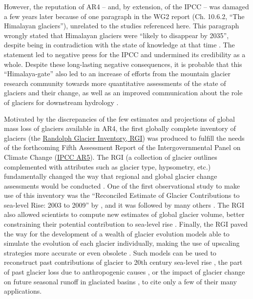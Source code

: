 However, the reputation of AR4 -- and, by extension, of the IPCC -- was damaged a few years later because of one
paragraph in the WG2 report (Ch. 10.6.2, “The Himalayan glaciers”), unrelated to the studies referenced here. This
paragraph wrongly stated that Himalayan glaciers were “likely to disappear by 2035”, despite being in contradiction with
the state of knowledge at that time \citep{Cogley2010}. The statement led to negative press for the IPCC and undermined its credibility as
a whole. Despite these long-lasting negative consequences, it is probable that this “Himalaya-gate” also led to an
increase of efforts from the mountain glacier research community towards more quantitative assessments of the state of
glaciers and their change, as well as an improved communication about the role of glaciers for downstream hydrology
\citep{Kaser.etal_2010,Radic2010,Radic2011,Bolch2012,Immerzeel2012}.

Motivated by the discrepancies of the few estimates and projections of global mass loss of glaciers available in AR4,
the first globally complete inventory of glaciers (the \href{https://www.glims.org/RGI}{Randolph Glacier Inventory, RGI}) was
produced to fulfill the needs of the forthcoming Fifth Assessment Report of the Intergovernmental Panel on Climate
Change (\href{https://www.ipcc.ch/report/ar5/wg1/}{IPCC AR5}). The RGI (a collection of glacier outlines complemented with
attributes such as glacier type, hypsometry, etc.) fundamentally changed the way that regional and global glacier change
assessments would be conducted \citep{Pfeffer2014}. One of the first observational study to make use of this inventory
was the “Reconciled Estimate of Glacier Contributions to sea-level Rise: 2003 to 2009” by 
\cite{Gardner2013}, and it was followed by many others \citep{Brun2017,Dussaillant2019,Shean2020}. The RGI also allowed
scientists to compute new estimates of global glacier volume, better constraining their potential contribution to
sea-level rise \citep{Huss2012,Grinsted2013}. Finally, the RGI paved the way for the development of a wealth of glacier
evolution models able to simulate the evolution of each glacier individually, making the use of upscaling strategies
more accurate or even obsolete
\citep{Marzeion2012,Giesen2012,Anderson2012,Giesen2013,Hirabayashi2013,Radic2014,Huss2015,Kraaijenbrink2017,Sakai2017,Shannon2019,Rounce2020}. 
Such models can be used to reconstruct past contributions of glacier to 20th century sea-level rise
\citep{Marzeion2015}, the part of past glacier loss due to anthropogenic causes \citep{Marzeion2014}, or the impact of
glacier change on future seasonal runoff in glaciated basins \citep{Bliss2014,Huss2018,Rounce2020b}, to cite only a few
of their many applications.

